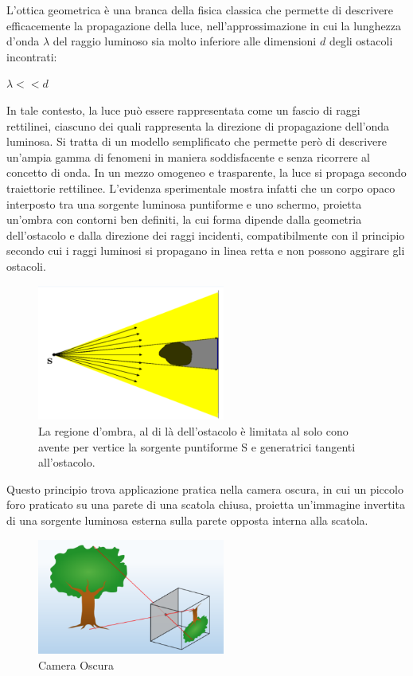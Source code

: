 L'ottica geometrica è una branca della fisica classica che permette di descrivere 
efficacemente la propagazione della luce, nell'approssimazione in cui la lunghezza d'onda $\lambda$ del raggio luminoso 
sia molto inferiore alle dimensioni $d$ degli ostacoli incontrati: 
\begin{center}
	$\lambda << d$
\end{center}
In tale contesto, la luce può essere rappresentata come un fascio di raggi rettilinei, 
ciascuno dei quali rappresenta la direzione di propagazione dell'onda luminosa. Si tratta di un modello semplificato che 
permette però di descrivere un'ampia gamma di fenomeni in maniera soddisfacente e senza ricorrere al concetto di onda. In un mezzo omogeneo e trasparente, la luce si propaga secondo traiettorie rettilinee. 
L'evidenza sperimentale mostra infatti che  un corpo opaco interposto tra una sorgente luminosa puntiforme e uno schermo, 
proietta un'ombra con contorni ben definiti, la cui forma dipende dalla geometria dell'ostacolo e dalla direzione dei raggi incidenti, 
compatibilmente con il principio secondo cui i raggi luminosi si propagano in linea retta e non possono aggirare gli ostacoli.
\begin{figure}[H]
	\centering
	\includegraphics[width=0.55\textwidth]{./figures/cono-luce.png}
	\caption{La regione d’ombra, al di là
		dell’ostacolo è limitata al solo
		cono avente per vertice la sorgente
		puntiforme S e generatrici tangenti
		all’ostacolo.}
\end{figure}

Questo principio trova applicazione pratica nella camera oscura, in cui un piccolo foro praticato su una parete di una scatola chiusa, proietta un'immagine invertita di una sorgente 
luminosa esterna sulla parete opposta interna alla scatola.
\begin{figure}[H]
	\centering
	\includegraphics[width=0.55\textwidth]{./figures/camera_oscura.png}
	\caption{Camera Oscura}
\end{figure}

